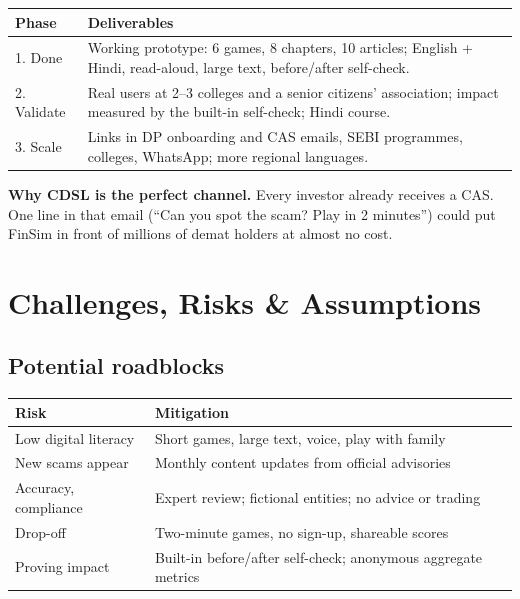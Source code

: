 \documentclass[10pt,twocolumn]{article}
\newenvironment{inlinetable}{\par\smallskip\noindent\begin{minipage}{\columnwidth}\centering\footnotesize}{\end{minipage}\par\smallskip}
\newcommand{\pitch}[1]{\par\noindent\colorbox{mint}{\parbox{\dimexpr\columnwidth-2\fboxsep}{\small #1}}\par\vspace{2pt}}
\begin{document}
\begin{inlinetable}
\label{tab:plan}
\begin{tabularx}{\columnwidth}{@{}p{1.45cm}L@{}}
\toprule
\textbf{Phase} & \textbf{Deliverables} \\
. Done          & Working prototype: 6 games, 8 chapters, 10 articles; English + Hindi, read-aloud, large text, before/after self-check. \\
2. Validate  & Real users at 2--3 colleges and a senior citizens' association; impact measured by the built-in self-check; Hindi course. \\
3. Scale         & Links in DP onboarding and CAS emails, SEBI programmes, colleges, WhatsApp; more regional languages. \\
\bottomrule
\end{tabularx}
\end{inlinetable}

\pitch{\textbf{Why CDSL is the perfect channel.} Every investor already receives a CAS. One line in that email (``Can you spot
the scam? Play in 2 minutes'') could put FinSim in front of millions of demat holders at almost no cost.}

\section{Challenges, Risks \& Assumptions}

\subsection{Potential roadblocks}
\begin{inlinetable}
\label{tab:risks}
\begin{tabularx}{\columnwidth}{@{}p{2.1cm}L@{}}
\toprule
\textbf{Risk} & \textbf{Mitigation} \\
\midrule
Low digital literacy & Short games, large text, voice, play with family \\
New scams appear     & Monthly content updates from official advisories \\
Accuracy, compliance & Expert review; fictional entities; no advice or trading \\
Drop-off             & Two-minute games, no sign-up, shareable scores \\
Proving impact       & Built-in before/after self-check; anonymous aggregate metrics \\
\bottomrule
\end{tabularx}
\end{inlinetable}
\end{document}
